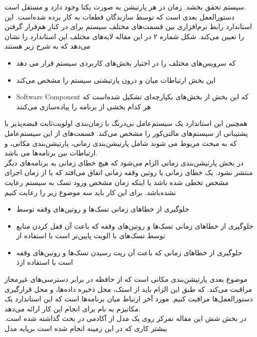 \documentclass[a4paper, 12pt]{article}
\begin{document}
سیستم تحقق بخشد. زمان در هر پارتیشن به صورت یکتا وجود دارد و مستقل است. \\
دستورالعمل بعدی
است که توسط سازندگان قطعات به کار برده شده‌است.
این استاندارد رابط نرم‌افزاری بین قسمت‌‌های مختلف سیستم برای در کنار هم‌قرار گرفتن را تعیین می‌کند.
شکل شماره ۲ در این مقاله لایه‌های مختلف این استاندارد را نشان می‌دهد که به شرح زیر‌ هستند
\begin{itemize}
    \item {}
    که سرویس‌های مختلف را در اختیار بخش‌های کاربردی سیستم قرار می دهد
    \item {}
    این بخش ارتباطات میان و درون پارتیشنی سیستم را مشخص می‌کند
    \item{Software Component}
    که این بخش از بخش‌های یکپارچه‌ای تشکیل شده‌است که هر کدام بخشی از برنامه را پیاده‌سازی می‌کنند
\end{itemize}
همچنین این استاندارد یک سیستم‌عامل بی‌درنگ با زمان‌بندی اولویت‌ثابت قبضه‌پذیر با پشتیبانی
از سیستم‌های مالتی‌کور را مشخص می‌کند.
قسمت‌های از این سیستم‌عامل که به مبحث
مربوط می‌ شوند شامل پارتیشن‌بندی زمانی، پارتیشن‌بندی مکانی، و ارتباطات بین برنامه‌ها می باشد. \\
در بخش پارتیشن‌بندی زمانی الزام می‌شود که هیچ خطای زمانی به برنامه‌های دیگر منتشر نشود.
یک خطای زمانی یا روتین وقفه زمانی اتفاق می‌افتد که یا از زمان اجرای مشخص تخطی شده‌ ‌باشد
یا اینکه زمان مشخص ورود تسک به سیستم رعایت نشده‌باشد.
برای این کار باید سه موضوع زیر را رعایت کنیم
\begin{itemize}
    \item جلوگیری از خطا‌های زمانی تسک‌ها و روتین‌های وقفه توسط 
    \item جلوگیری از خطا‌های‌ زمانی تسک‌ها و روتین‌های وقفه که باعث آن قفل کردن منابع
    توسط تسک‌های با الویت پایین‌تر است با استفاده از 
    \item جلوگیری از خطا‌های زمانی که باعث‌ آن ریت رسیدن تسک‌ها و روتین‌های وقفه است با استفاده ازذ  
\end{itemize}
موضوع بعدی پارتیشن‌بندی مکانی است که از حافظه در برابر دسترسی‌های غیر‌مجاز مراقبت می‌کند.
که طبق این الزام باید از استک، محل ذخیره داده‌ها، و محل قرارگیری دستورالعمل‌ها مراقبت کنیم.
مورد آخر ارتباط میان برنامه‌ها است که این استاندارد یک مکانیزم به نام
برای انجام این کار ارائه می‌دهد. \\
در بخش شش این مقاله تمرکز روی یک مدل از آکادمی در بحث
گذاشته شده است.
بیشتر کاری که در این زمینه انجام شده است برپایه مدل
\end{document}
